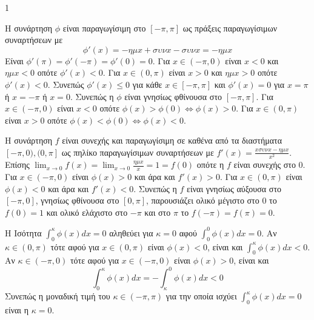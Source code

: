 \begin{ylh}{1}
    \item [Ύλη από εικόνα]
\end{ylh}
\begin{alist}
\item Η συνάρτηση $\phi$ είναι παραγωγίσιμη στο $[-\pi,\pi]$ ως πράξεις παραγωγίσιμων συναρτήσεων με
\[ \phi'(x) = -\eta\mu x + \sigma\upsilon\nu x - \sigma\upsilon\nu x = -\eta\mu x \]
Είναι $\phi'(\pi) = \phi'(-\pi) = \phi'(0) = 0$.
Για $x \in (-\pi,0)$ είναι $x<0$ και $\eta\mu x<0$ οπότε $\phi'(x)<0$.
Για $x \in (0,\pi)$ είναι $x>0$ και $\eta\mu x>0$ οπότε $\phi'(x)<0$.
Συνεπώς $\phi'(x) \leq 0$ για κάθε $x \in [-\pi,\pi]$ και $\phi'(x)=0$ για $x=\pi$ ή $x=-\pi$ ή $x=0$.
Συνεπώς η $\phi$ είναι γνησίως φθίνουσα στο $[-\pi,\pi]$.
Για $x \in (-\pi,0)$ είναι $x<0$ οπότε $\phi(x) > \phi(0) \Leftrightarrow \phi(x) > 0$.
Για $x \in (0,\pi)$ είναι $x>0$ οπότε $\phi(x) < \phi(0) \Leftrightarrow \phi(x) < 0$. \monades{}

\item Η συνάρτηση $f$ είναι συνεχής και παραγωγίσιμη σε καθένα από τα διαστήματα $[-\pi,0), (0,\pi]$ ως πηλίκο παραγωγίσιμων συναρτήσεων με $f'(x) = \frac{x\sigma\upsilon\nu x - \eta\mu x}{x^2}$.
Επίσης $\lim_{x \to 0} f(x) = \lim_{x \to 0} \frac{\eta\mu x}{x} = 1 = f(0)$ οπότε η $f$ είναι συνεχής στο $0$.
Για $x \in (-\pi,0)$ είναι $\phi(x)>0$ και άρα και $f'(x)>0$.
Για $x \in (0,\pi)$ είναι $\phi(x)<0$ και άρα και $f'(x)<0$.
Συνεπώς η $f$ είναι γνησίως αύξουσα στο $[-\pi,0]$, γνησίως φθίνουσα στο $[0,\pi]$, παρουσιάζει ολικό μέγιστο στο $0$ το $f(0)=1$ και ολικό ελάχιστο στο $-\pi$ και στο $\pi$ το $f(-\pi)=f(\pi)=0$. \monades{}

\item Η Ισότητα $\int_{0}^{\kappa} \phi(x)dx = 0$ αληθεύει για $\kappa=0$ αφού $\int_{0}^{0} \phi(x)dx = 0$.
Αν $\kappa \in (0,\pi)$ τότε αφού για $x \in (0,\pi)$ είναι $\phi(x)<0$, είναι και $\int_{0}^{\kappa} \phi(x)dx < 0$.
Αν $\kappa \in (-\pi,0)$ τότε αφού για $x \in (-\pi,0)$ είναι $\phi(x)>0$, είναι και
\[ \int_{0}^{\kappa} \phi(x)dx = -\int_{\kappa}^{0} \phi(x)dx < 0 \]
Συνεπώς η μοναδική τιμή του $\kappa \in (-\pi,\pi)$ για την οποία ισχύει $\int_{0}^{\kappa} \phi(x)dx = 0$ είναι η $\kappa=0$. \monades{}
\end{alist}